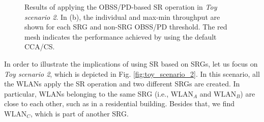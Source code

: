\documentclass[preprint,12pt]{elsarticle}
\begin{document}
	\begin{figure}[ht!]
		\centering
		\hspace{1cm}
		\caption{Results of applying the OBSS/PD-based SR operation in \emph{Toy scenario 2}. In (b), the individual and max-min throughput are shown for each SRG and non-SRG OBSS/PD threshold. The red mesh indicates the performance achieved by using the default CCA/CS.}
		\label{fig:fig:17}
	\end{figure}
	
	In order to illustrate the implications of using SR based on SRGs, let us focus on \emph{Toy scenario 2}, which is depicted in Fig. \ref{fig:toy_scenario_2}. In this scenario, all the WLANs apply the SR operation and two different SRGs are created. In particular, WLANs belonging to the same SRG (i.e., $\text{WLAN}_A$ and $\text{WLAN}_B$) are close to each other, such as in a residential building. Besides that, we find $\text{WLAN}_C$, which is part of another SRG. 
	

	
%	
	
\end{document}
